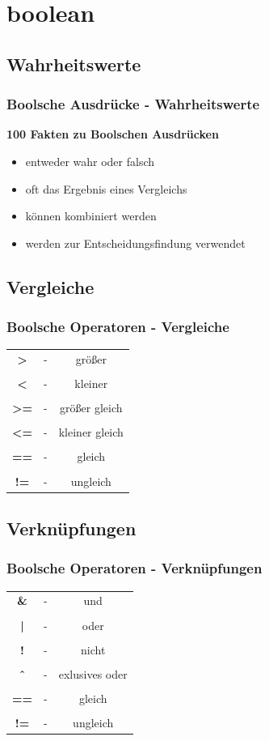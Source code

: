 \documentclass[final]{beamer}
\begin{document}
\section{boolean}
\subsection{Wahrheitswerte}
\begin{frame}
	\frametitle{Boolsche Ausdrücke - Wahrheitswerte}
	\textbf{100 Fakten zu Boolschen Ausdrücken}
	\begin{itemize}
		\item{entweder wahr oder falsch}
		\item{oft das Ergebnis eines Vergleichs}
		\item{können kombiniert werden}
		\item{werden zur Entscheidungsfindung verwendet}
	\end{itemize}
\end{frame}


\subsection{Vergleiche}
\begin{frame}
	\frametitle{Boolsche Operatoren - Vergleiche}
	\begin{tabular}{c c c}
		\textbf{>}  & - & größer \\&&\\
		\textbf{<} & - & kleiner \\&&\\
		\textbf{>=} & - & größer gleich \\&&\\
		\textbf{<=}  & - &  kleiner gleich \\&&\\
		\textbf{==} & - & gleich \\&&\\
		\textbf{!=} & - & ungleich \\
	\end{tabular}
\end{frame}

\subsection{Verknüpfungen}
\begin{frame}
	\frametitle{Boolsche Operatoren - Verknüpfungen}
	\begin{tabular}{c c c}
		\textbf{\&}  & - & und \\&&\\
		\textbf{|} & - & oder \\&&\\
		\textbf{!} & - & nicht \\&&\\
		\textbf{\^\ }  & - &  exlusives oder \\&&\\
		\textbf{==} & - & gleich \\&&\\
		\textbf{!=} & - & ungleich \\
	\end{tabular}
\end{frame}
\end{document}
